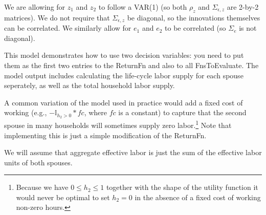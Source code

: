 We are allowing for $z_1$ and $z_2$ to follow a VAR(1) (so both $\rho_z$ and $\Sigma_{\epsilon,z}$ are 2-by-2 matrices). We do not require that $\Sigma_{\epsilon,z}$ be diagonal, so the innovations themselves can be correlated. We similarly allow for $e_1$ and $e_2$ to be correlated (so $\Sigma_{e}$ is not diagonal).

This model demonstrates how to use two decision variables: you need to put them as the first two entries to the ReturnFn and also to all FnsToEvaluate. The model output includes calculating the life-cycle labor supply for each spouse seperately, as well as the total household labor supply.

A common variation of the model used in practice would add a fixed cost of working (e.g., $-\mathbb{I}_{h_2>0}*fc$, where $fc$ is a constant) to capture that the second spouse in many households will sometimes supply zero labor.\footnote{Because we have $0\leq h_2 \leq 1$ together with the shape of the utility function it would never be optimal to set $h_2=0$ in the absence of a fixed cost of working non-zero hours.} Note that implementing this is just a simple modification of the ReturnFn.

We will assume that aggregate effective labor is just the sum of the effective labor units of both spouses.

